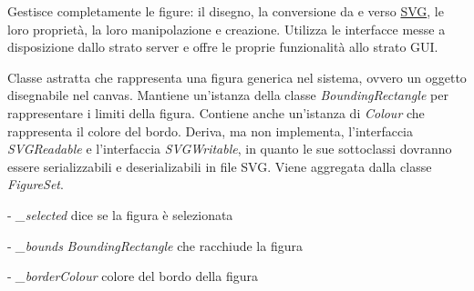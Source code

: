 Gestisce completamente le figure: il disegno, la conversione da e verso \underline{SVG}, le loro propriet\`a, la loro manipolazione e creazione. Utilizza le interfacce messe a disposizione dallo strato server e offre le proprie funzionalit\`a allo strato GUI.

Classe astratta che rappresenta una figura generica nel sistema, ovvero un oggetto disegnabile nel canvas.
Mantiene un'istanza della classe \textit{BoundingRectangle} per rappresentare i limiti della figura. Contiene anche un'istanza di \textit{Colour} che rappresenta il colore del bordo. Deriva, ma non implementa, l'interfaccia \textit{SVGReadable} e l'interfaccia \textit{SVGWritable}, in quanto le sue sottoclassi dovranno essere serializzabili e deserializabili in file SVG.
Viene aggregata dalla classe \textit{FigureSet}.
\begin{elencopuntato}[\subsubsecindent]
\item[-] \textit{{\_}selected} dice se la figura \`e selezionata
\item[-] \textit{{\_}bounds} \textit{BoundingRectangle} che racchiude la figura
\item[-] \textit{{\_}borderColour} colore del bordo della figura
\end{elencopuntato}
